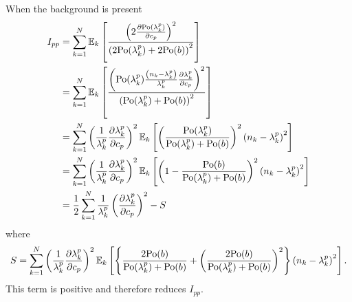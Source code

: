 When the background is present 
%
\begin{alignat*}{1}
	I_{pp} & =\sum_{k=1}^N\mathbb{E}_k\left[\frac{\left(2\frac{\partial\mathrm{Po}(\lambda_k^p)}{\partial c_p}\right)^2}{\left(2\mathrm{Po}(\lambda_k^p)+2\mathrm{Po}(b)\right)^2}\right]\\
 	& =\sum_{k=1}^N\mathbb{E}_k\left[\frac{\left(\mathrm{Po}(\lambda_k^p)\frac{\left(n_k-\lambda_k^p\right)}{\lambda_k^p}\frac{\partial\lambda_k^p}{\partial c_p}\right)^2}{\left(\mathrm{Po}(\lambda_k^p)+\mathrm{Po}(b)\right)^2}\right]\\
 	& =\sum_{k=1}^N\left(\frac{1}{\lambda_k^p}\frac{\partial\lambda_k^p}{\partial c_p}\right)^2\mathbb{E}_k\left[\left(\frac{\mathrm{Po}(\lambda_k^p)}{\mathrm{Po}(\lambda_k^p)+\mathrm{Po}(b)}\right)^2\left(n_k-\lambda_k^p\right)^2\right]\\
 	& =\sum_{k=1}^N\left(\frac{1}{\lambda_k^p}\frac{\partial\lambda_k^p}{\partial c_p}\right)^2\mathbb{E}_k\left[\left(1-\frac{\mathrm{Po}(b)}{\mathrm{Po}(\lambda_k^p)+\mathrm{Po}(b)}\right)^2\left(n_k-\lambda_k^p\right)^2\right]\\
 	& =\frac{1}{2}\sum_{k=1}^N\frac{1}{\lambda_k^p}\left(\frac{\partial\lambda_k^p}{\partial c_p}\right)^2-S
\end{alignat*}
%
where
%
\begin{equation}
	S=\sum_{k=1}^N\left(\frac{1}{\lambda_k^p}\frac{\partial\lambda_k^p}{\partial c_p}\right)^2\mathbb{E}_k\left[\left\{ \frac{2\mathrm{Po}(b)}{\mathrm{Po}(\lambda_k^p)+\mathrm{Po}(b)}+\left(\frac{2\mathrm{Po}(b)}{\mathrm{Po}(\lambda_k^p)+\mathrm{Po}(b)}\right)^2\right\} \left(n_k-\lambda_k^p\right)^2\right].
\end{equation}
%
This term is positive and therefore reduces $I_{pp}$.